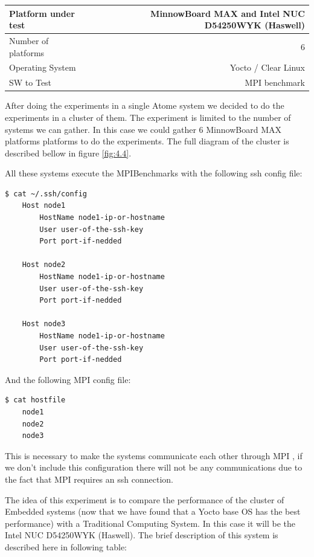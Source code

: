     \begin{center}
    \begin{tabular}{ | l | r |}
        \hline
        Platform under test &  MinnowBoard MAX  and Intel NUC D54250WYK
        (Haswell)\\ \hline
        Number of platforms  & 6  \\ \hline
        Operating System & Yocto / Clear Linux  \\ \hline
        SW to Test & MPI benchmark \\ \hline
    \end{tabular}
    \end{center}

After doing the experiments in a single Atome system we decided to do the
experiments in a cluster of them. The experiment is limited to the number of
systems we can gather. In this case we could gather 6  MinnowBoard MAX
platforms \cite{minnowboard} platforms to do the experiments. The full diagram
of the cluster is described bellow in figure \ref{fig:4.4}.


All these systems execute the MPIBenchmarks with the following ssh config file:


\begin{lstlisting}[frame=single,language=bash]
  $ cat ~/.ssh/config
    Host node1
        HostName node1-ip-or-hostname
        User user-of-the-ssh-key
        Port port-if-nedded

    Host node2
        HostName node1-ip-or-hostname
        User user-of-the-ssh-key
        Port port-if-nedded

    Host node3
        HostName node1-ip-or-hostname
        User user-of-the-ssh-key
        Port port-if-nedded

\end{lstlisting}

And the following MPI config file:


\begin{lstlisting}[frame=single,language=bash]
  $ cat hostfile
    node1
    node2
    node3
\end{lstlisting}

This is necessary to make the systems communicate each other through MPI , if we
don't include this configuration there will not be any communications due to the
fact that MPI requires an ssh connection. 

The idea of this experiment is to compare the performance of the cluster of
Embedded systems (now that we have found that a Yocto base OS has the best
performance) with a Traditional Computing System. In this case it will be the
Intel NUC D54250WYK (Haswell). The brief description of this system is
described here in following table: 


